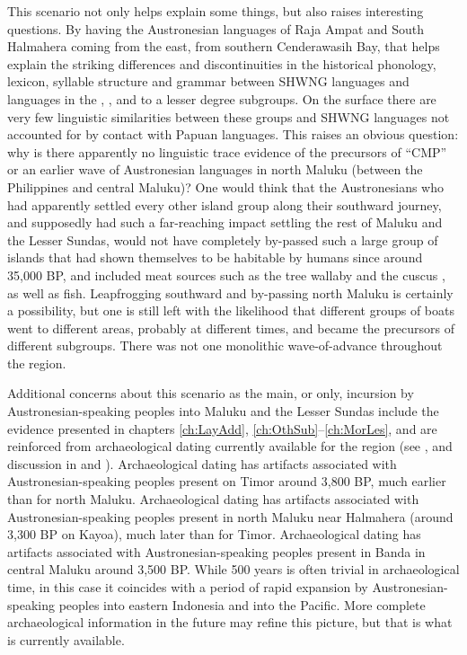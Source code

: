 This scenario not only helps explain some things,
but also raises interesting questions.
By having the Austronesian languages of Raja Ampat
and South Halmahera coming from the east,
from southern Cenderawasih Bay,
that helps explain the striking differences
and discontinuities in the historical phonology,
lexicon, syllable structure and grammar between SHWNG languages
and languages in the ,
, and to a lesser degree  subgroups.
On the surface there are very few linguistic similarities between
these groups and SHWNG languages not accounted for by contact with Papuan languages.
This raises an obvious question: why is there apparently no linguistic
trace evidence of the precursors of “CMP” or an earlier wave
of Austronesian languages in north Maluku (between the Philippines
and central Maluku)? One would think that the Austronesians who
had apparently settled every other island group along their southward
journey, and supposedly had such a far-reaching impact settling the rest
of Maluku and the Lesser Sundas,
would not have completely by-passed such a large group of islands
that had shown themselves to be habitable by humans since around
35,000 BP, and included meat sources such as the tree wallaby
and the cuscus \citep{Bellwood2019a},
as well as fish.
Leapfrogging southward and by-passing north Maluku is certainly
a possibility, but one is still left with the likelihood that different groups
of boats went to different areas,
probably at different times,
and became the precursors of different subgroups.
There was not one monolithic wave-of-advance throughout the region.

Additional concerns about this scenario as the main, or only, incursion
by Austronesian-speaking peoples into Maluku
and the Lesser Sundas include the evidence presented in chapters
\ref{ch:LayAdd}, \ref{ch:OthSub}--\ref{ch:MorLes},
and are reinforced from archaeological dating currently
available for the region (see \citealp{Spriggs2011,Bellwood2019ed},
and discussion in  and ).
Archaeological dating has artifacts associated with Austronesian-speaking
peoples present on Timor around 3,800 BP,
much earlier than for north Maluku.
Archaeological dating has artifacts associated with Austronesian-speaking
peoples present in north Maluku near Halmahera (around 3,300
BP on Kayoa), much later than for Timor.
Archaeological dating has artifacts associated with Austronesian-speaking
peoples present in Banda in central Maluku around 3,500 BP.
While 500 years is often trivial in archaeological time,
in this case it coincides with a period of rapid expansion by
Austronesian-speaking peoples into eastern Indonesia
and into the Pacific.
More complete archaeological information in the future may refine
this picture, but that is what is currently available.

